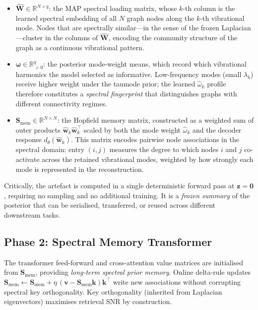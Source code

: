 \documentclass[11pt,a4paper]{article}
\newcommand{\Smat}{\mathbf{S}}
\newcommand{\Wmat}{\mathbf{W}}
\newcommand{\R}{\mathbb{R}}
\newcommand{\T}{^{\intercal}}
\begin{document}
\begin{itemize}
  \item $\hat{\Wmat}\in\R^{N\times q}$: the MAP spectral loading matrix,
        whose $k$-th column is the learned spectral embedding of all $N$ graph
        nodes along the $k$-th vibrational mode.  Nodes that are spectrally
        similar---in the sense of the frozen Laplacian---cluster in the columns
        of $\hat{\Wmat}$, encoding the community structure of the graph as a
        continuous vibrational pattern.
  \item $\hat{\boldsymbol{\omega}}\in\R^q_{>0}$: the posterior mode-weight means,
        which record which vibrational harmonics the model selected as
        informative.  Low-frequency modes (small $\lambda_k$) receive higher
        weight under the taumode prior; the learned $\hat{\omega}_k$ profile
        therefore constitutes a \emph{spectral fingerprint} that distinguishes
        graphs with different connectivity regimes.
  \item $\Smat_{\mathrm{mem}}\in\R^{N\times N}$: the Hopfield memory matrix,
        constructed as a weighted sum of outer products $\hat{\mathbf{w}}_k\hat{\mathbf{w}}_k\T$
        scaled by both the mode weight $\hat{\omega}_k$ and the decoder
        response $d_\theta(\hat{\mathbf{w}}_k)$.  This matrix encodes pairwise
        node associations in the spectral domain: entry $(i,j)$ measures the
        degree to which nodes $i$ and $j$ co-activate across the retained
        vibrational modes, weighted by how strongly each mode is represented
        in the reconstruction.
\end{itemize}

Critically, the artefact is computed in a single deterministic forward pass at
$\mathbf{z}=\mathbf{0}$, requiring no sampling and no additional training.
It is a \emph{frozen summary} of the posterior that can be serialised,
transferred, or reused across different downstream tasks.

\subsection{Phase 2: Spectral Memory Transformer}
\label{sec:memory:transformer}

The transformer feed-forward and cross-attention value matrices are
initialised from $\Smat_{\mathrm{mem}}$, providing \emph{long-term spectral
prior memory}.  Online delta-rule updates
$\Smat_{\mathrm{mem}} \leftarrow \Smat_{\mathrm{mem}} + \eta\,(\mathbf{v}-\Smat_{\mathrm{mem}}\mathbf{k})\mathbf{k}\T$
write new associations without corrupting spectral key orthogonality.
Key orthogonality (inherited from Laplacian eigenvectors) maximises
retrieval SNR by construction.
\end{document}
